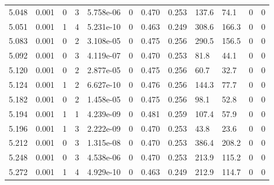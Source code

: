 \documentclass[preview]{standalone}
\begin{document}
{{{{{{\begin{tabular}{L{1.2cm}C{1.2cm} C{0.3cm}C{0.5cm} C{1.4cm}C{1.4cm} C{1.4cm}C{1.4cm} C{1.6cm}C{1.6cm} C{1.6cm}C{1.6cm}}
  5.048  &  0.001  & 0     &  3 &  5.758e-06  & 0  &  0.470&   0.253& 137.6 & 74.1   &  0 & 0  \\ 
  5.051  &  0.001  & 1     &  4 &  5.231e-10  & 0  &  0.463&   0.249& 308.6 & 166.3   &  0 & 0  \\ 
  5.083  &  0.001  & 0     &  2 &  3.108e-05  & 0  &  0.475&   0.256& 290.5 & 156.5   &  0 & 0  \\ 
  5.092  &  0.001  & 0     &  3 &  4.119e-07  & 0  &  0.470&   0.253& 81.8 & 44.1   &  0 & 0  \\ 
  5.120  &  0.001  & 0     &  2 &  2.877e-05  & 0  &  0.475&   0.256& 60.7 & 32.7   &  0 & 0  \\ 
  5.124  &  0.001  & 1     &  2 &  6.627e-10  & 0  &  0.476&   0.256& 144.3 & 77.7   &  0 & 0  \\ 
  5.182  &  0.001  & 0     &  2 &  1.458e-05  & 0  &  0.475&   0.256& 98.1 & 52.8   &  0 & 0  \\ 
  5.194  &  0.001  & 1     &  1 &  4.239e-09  & 0  &  0.481&   0.259& 107.4 & 57.9   &  0 & 0  \\ 
  5.196  &  0.001  & 1     &  3 &  2.222e-09  & 0  &  0.470&   0.253& 43.8 & 23.6   &  0 & 0  \\ 
  5.212  &  0.001  & 0     &  3 &  1.315e-08  & 0  &  0.470&   0.253& 386.4 & 208.2   &  0 & 0  \\ 
  5.248  &  0.001  & 0     &  3 &  4.538e-06  & 0  &  0.470&   0.253& 213.9 & 115.2   &  0 & 0  \\ 
  5.272  &  0.001  & 1     &  4 &  4.929e-10  & 0  &  0.463&   0.249& 212.9 & 114.7   &  0 & 0  \\ 
\hline 
\end{tabular} 

}}}}}}
\end{document}
